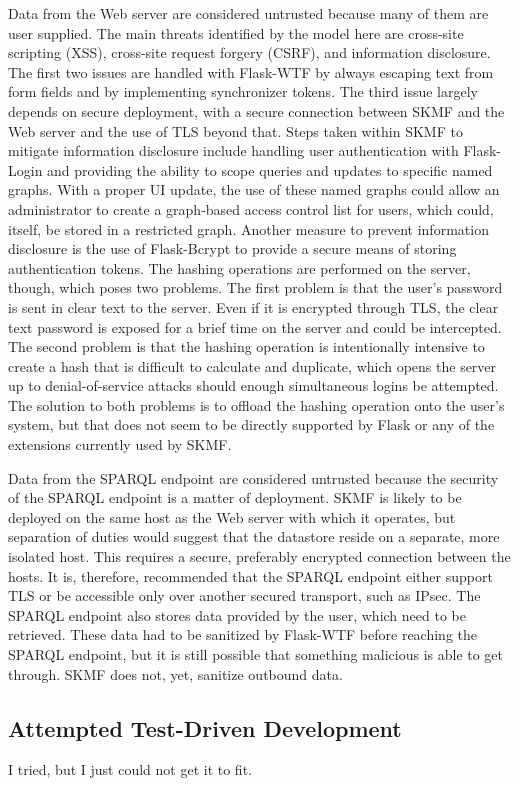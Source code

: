 Data from the Web server are considered untrusted because many of them are user supplied. The main threats identified by the model here are cross-site scripting (XSS), cross-site request forgery (CSRF), and information disclosure. The first two issues are handled with Flask-WTF by always escaping text from form fields and by implementing synchronizer tokens. The third issue largely depends on secure deployment, with a secure connection between SKMF and the Web server and the use of TLS beyond that. Steps taken within SKMF to mitigate information disclosure include handling user authentication with Flask-Login and providing the ability to scope queries and updates to specific named graphs. With a proper UI update, the use of these named graphs could allow an administrator to create a graph-based access control list for users, which could, itself, be stored in a restricted graph. Another measure to prevent information disclosure is the use of Flask-Bcrypt to provide a secure means of storing authentication tokens. The hashing operations are performed on the server, though, which poses two problems. The first problem is that the user's password is sent in clear text to the server. Even if it is encrypted through TLS, the clear text password is exposed for a brief time on the server and could be intercepted. The second problem is that the hashing operation is intentionally intensive to create a hash that is difficult to calculate and duplicate, which opens the server up to denial-of-service attacks should enough simultaneous logins be attempted. The solution to both problems is to offload the hashing operation onto the user's system, but that does not seem to be directly supported by Flask or any of the extensions currently used by SKMF.

Data from the SPARQL endpoint are considered untrusted because the security of the SPARQL endpoint is a matter of deployment. SKMF is likely to be deployed on the same host as the Web server with which it operates, but separation of duties would suggest that the datastore reside on a separate, more isolated host. This requires a secure, preferably encrypted connection between the hosts. It is, therefore, recommended that the SPARQL endpoint either support TLS or be accessible only over another secured transport, such as IPsec. The SPARQL endpoint also stores data provided by the user, which need to be retrieved. These data had to be sanitized by Flask-WTF before reaching the SPARQL endpoint, but it is still possible that something malicious is able to get through. SKMF does not, yet, sanitize outbound data.


\subsection{Attempted Test-Driven Development}

I tried, but I just could not get it to fit.
